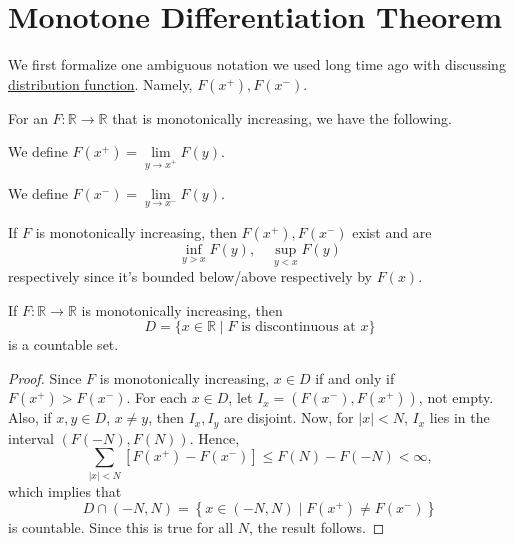 \section{Monotone Differentiation Theorem}
We first formalize one ambiguous notation we used long time ago with discussing \hyperref[def:distribution-function]{distribution function}.
Namely, \(F(x^+), F(x^-)\).
\begin{definition*}
	For an \(F \colon  \mathbb{R} \to \mathbb{R}\) that is monotonically increasing, we have the following.
	\begin{definition}[\(F(x^+)\)]\label{def:x-plus}
		We define \(F(x^+) = \lim\limits_{y \to x^+} F(y)\).
	\end{definition}
	\begin{definition}[\(F(x^-)\)]\label{def:x-minus}
		We define \(F(x^-) = \lim\limits_{y \to x^-} F(y)\).
	\end{definition}
\end{definition*}
\begin{remark}
	If \(F\) is monotonically increasing, then \(F(x^+), F(x^-)\) exist and are
	\[
		\inf_{y > x} F(y),\quad \sup_{y < x} F(y)
	\]
	respectively since it's bounded below/above respectively by \(F(x)\).
\end{remark}
\begin{lemma}\label{lma:lec-33}
	If \(F\colon \mathbb{R} \to \mathbb{R} \) is monotonically increasing, then
	\[
		D = \{x\in \mathbb{R}  \mid F \text{ is discontinuous at } x\}
	\]
	is a countable set.
\end{lemma}
\begin{proof}
	Since \(F\) is monotonically increasing, \(x \in D\) if and only if \(F(x^+) > F(x^-)\). For each \(x \in D\), let \(I_x = (F(x^-),F(x^+))\), not empty.
	Also, if \(x,y \in D\), \(x \neq y\), then \(I_x,I_y\) are disjoint. Now, for \(\left\vert x \right\vert < N\), \(I_x\) lies in the interval
	\((F(-N), F(N))\). Hence,
	\[
		\sum\limits_{\left\vert x \right\vert < N}\left[F(x^+) - F(x^-)\right] \leq F(N) - F(-N) <\infty,
	\]
	which implies that
	\[
		D \cap (-N, N) = \left\{x\in (-N, N) \mid F(x^+) \neq F(x^-)\right\}
	\]
	is countable. Since this is true for all \(N\), the result follows.
\end{proof}

